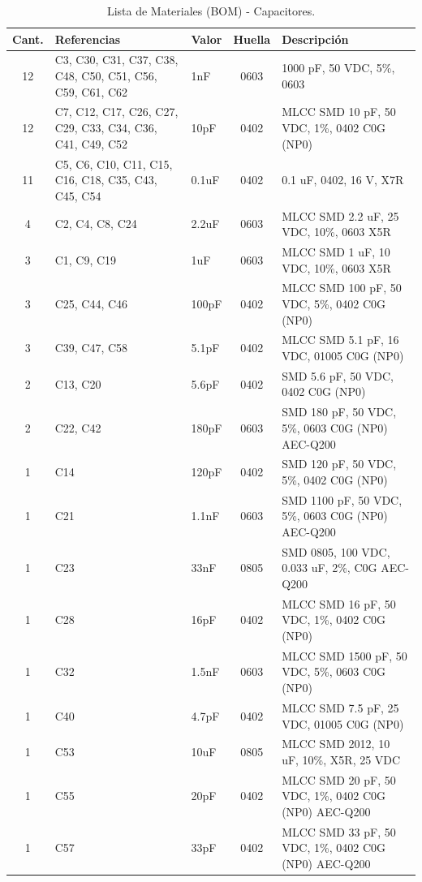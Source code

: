 \documentclass[11pt,a4paper,twoside]{report}
\begin{document}
	\begin{table}[h]
		\centering
		\small
		\begin{tabularx}{\textwidth}{c p{5cm} l c X}
			\toprule
			\textbf{Cant.} & \textbf{Referencias} & \textbf{Valor} & \textbf{Huella} & \textbf{Descripción} \\
			\midrule
			12 & C3, C30, C31, C37, C38, C48, C50, C51, C56, C59, C61, C62 & 1nF & 0603 & 1000 pF, 50 VDC, 5\%, 0603 \\
			12 & C7, C12, C17, C26, C27, C29, C33, C34, C36, C41, C49, C52 & 10pF & 0402 & MLCC SMD 10 pF, 50 VDC, 1\%, 0402 C0G (NP0) \\
			11 & C5, C6, C10, C11, C15, C16, C18, C35, C43, C45, C54 & 0.1uF & 0402 & 0.1 uF, 0402, 16 V, X7R \\
			4 & C2, C4, C8, C24 & 2.2uF & 0603 & MLCC SMD 2.2 uF, 25 VDC, 10\%, 0603 X5R \\
			3 & C1, C9, C19 & 1uF & 0603 & MLCC SMD 1 uF, 10 VDC, 10\%, 0603 X5R \\
			3 & C25, C44, C46 & 100pF & 0402 & MLCC SMD 100 pF, 50 VDC, 5\%, 0402 C0G (NP0) \\
			3 & C39, C47, C58 & 5.1pF & 0402 & MLCC SMD 5.1 pF, 16 VDC, 01005 C0G (NP0) \\
			2 & C13, C20 & 5.6pF & 0402 & SMD 5.6 pF, 50 VDC, 0402 C0G (NP0) \\
			2 & C22, C42 & 180pF & 0603 & SMD 180 pF, 50 VDC, 5\%, 0603 C0G (NP0) AEC-Q200 \\
			1 & C14 & 120pF & 0402 & SMD 120 pF, 50 VDC, 5\%, 0402 C0G (NP0) \\
			1 & C21 & 1.1nF & 0603 & SMD 1100 pF, 50 VDC, 5\%, 0603 C0G (NP0) AEC-Q200 \\
			1 & C23 & 33nF & 0805 & SMD 0805, 100 VDC, 0.033 uF, 2\%, C0G AEC-Q200 \\
			1 & C28 & 16pF & 0402 & MLCC SMD 16 pF, 50 VDC, 1\%, 0402 C0G (NP0) \\
			1 & C32 & 1.5nF & 0603 & MLCC SMD 1500 pF, 50 VDC, 5\%, 0603 C0G (NP0) \\
			1 & C40 & 4.7pF & 0402 & MLCC SMD 7.5 pF, 25 VDC, 01005 C0G (NP0) \\
			1 & C53 & 10uF & 0805 & MLCC SMD 2012, 10 uF, 10\%, X5R, 25 VDC \\
			1 & C55 & 20pF & 0402 & MLCC SMD 20 pF, 50 VDC, 1\%, 0402 C0G (NP0) AEC-Q200 \\
			1 & C57 & 33pF & 0402 & MLCC SMD 33 pF, 50 VDC, 1\%, 0402 C0G (NP0) AEC-Q200 \\
			\bottomrule
		\end{tabularx}
		\caption{Lista de Materiales (BOM) - Capacitores.}
		\label{tab:bom_capacitores}
	\end{table}
	
\end{document}
